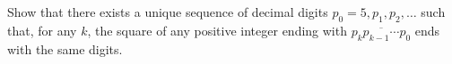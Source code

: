 Show that there exists a unique sequence of decimal digits $p_0=5,p_1,p_2,\ldots$ such that, for any $k$, the square of any positive integer ending with $\overline{p_kp_{k-1}\cdots p_0}$ ends with the same digits.